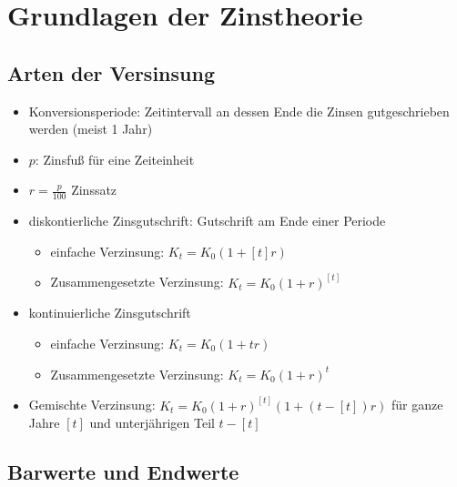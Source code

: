\documentclass[12pt]{report}
\theoremstyle{dotless}
\theoremstyle{definition}
\begin{document}



\section{Grundlagen der Zinstheorie}

\subsection{Arten der Versinsung}

\begin{itemize}
	\item Konversionsperiode: Zeitintervall an dessen Ende die Zinsen gutgeschrieben werden (meist 1 Jahr)
	\item $p$: Zinsfu{\ss} f\"ur eine Zeiteinheit
	\item $r=\frac{p}{100}$ Zinssatz
	\item diskontierliche Zinsgutschrift: Gutschrift am Ende einer Periode
		\begin{itemize}
			\item einfache Verzinsung: $K_t = K_0(1+[t]r)$
			\item Zusammengesetzte Verzinsung: $K_t=K_0(1+r)^{[t]}$
		\end{itemize}
	\item kontinuierliche Zinsgutschrift
		\begin{itemize}
			\item einfache Verzinsung: $K_t = K_0(1+tr)$
			\item Zusammengesetzte Verzinsung: $K_t=K_0(1+r)^{t}$
		\end{itemize}
	\item Gemischte Verzinsung: $K_t=K_0(1+r)^{[t]}(1+(t-[t])r)$ f\"ur ganze Jahre $[t]$ und unterj\"ahrigen Teil $t-[t]$
\end{itemize}

\subsection{Barwerte und Endwerte}
\end{document}
